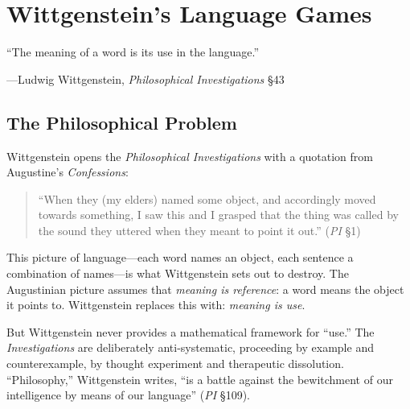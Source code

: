 %
%



\chapter{Wittgenstein's Language Games}
\label{ch:wittgenstein}

\epigraph{``The meaning of a word is its use in the language.''}
{---Ludwig Wittgenstein, \emph{Philosophical Investigations} \S43}


\section{The Philosophical Problem}

Wittgenstein opens the \emph{Philosophical Investigations} with a quotation
from Augustine's \emph{Confessions}:
\begin{quote}
``When they (my elders) named some object, and accordingly moved towards
something, I saw this and I grasped that the thing was called by the sound
they uttered when they meant to point it out.'' (\emph{PI} \S1)
\end{quote}
This picture of language---each word names an object, each sentence a
combination of names---is what Wittgenstein sets out to destroy. The
Augustinian picture assumes that \emph{meaning is reference}: a word means
the object it points to. Wittgenstein replaces this with: \emph{meaning is
use}.

But Wittgenstein never provides a mathematical framework for ``use.'' The
\emph{Investigations} are deliberately anti-systematic, proceeding by example
and counterexample, by thought experiment and therapeutic dissolution.
``Philosophy,'' Wittgenstein writes, ``is a battle against the bewitchment of
our intelligence by means of our language'' (\emph{PI} \S109).

